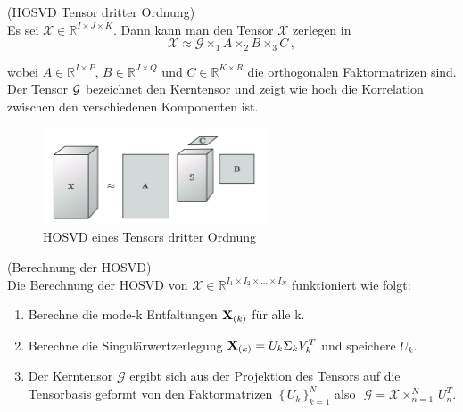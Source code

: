 \begin{Beispiel} (HOSVD Tensor dritter Ordnung) \\
Es sei $\pmb{\mathscr{X}} \in \mathbb{R}^{I \times J \times K}$.  Dann kann man den Tensor $\pmb{\mathscr{X}}$ zerlegen in 
\begin{equation}
{\pmb{\mathscr{X}}} \approx  \pmb{\mathscr{G}}  \times_1 A \times_2 B \times_3 C  \, ,
\end{equation}

wobei $A \in \mathbb{R}^{I \times P}$, $B \in \mathbb{R}^{J \times Q}$ und $C \in \mathbb{R}^{K \times R}$ die orthogonalen Faktormatrizen sind.
Der Tensor ${\cal G}$ bezeichnet den Kerntensor und zeigt wie hoch die Korrelation zwischen den verschiedenen Komponenten ist.

\end{Beispiel}
\begin{figure}[ht]
	\centering
  \includegraphics[width=0.6\textwidth]{hosvdTensor.png}
	\caption{HOSVD eines Tensors dritter Ordnung \cite[475]{Kolda}}
	\label{fig:hosvdTensor}
\end{figure}

\begin{framed}
\begin{Bemerkung} (Berechnung der HOSVD) \\ \label{hosvd}
Die Berechnung der HOSVD von ${\pmb{\mathscr{X}}}  \in \mathbb{R}^{I_1 \times I_2 \times \dots \times I_N}$ funktioniert wie folgt:
\begin{enumerate}
\item Berechne die mode-k Entfaltungen $\bold{X}_{(k)}$ für alle k.
\item Berechne die Singulärwertzerlegung $\bold{X}_{(k)}=U_k \Sigma_k V_k^T$ und speichere $U_k$.
\item Der Kerntensor ${\pmb{\mathscr{G}}} $ ergibt sich aus der Projektion des Tensors auf die Tensorbasis geformt von den Faktormatrizen  $ \, \{ \, U_k \, \}_{k=1}^{N}$  also $\, \, {\pmb{\mathscr{G}}} ={\pmb{\mathscr{X}}}  \times_{n=1}^{N} \, U_n^T$.
\end{enumerate}
\end{Bemerkung}
\end{framed}

